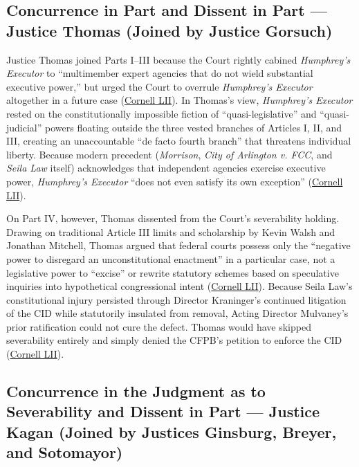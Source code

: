 \documentclass[12pt]{article}
\begin{document}
\subsection{Concurrence in Part and Dissent in Part --- Justice Thomas (Joined by Justice Gorsuch)}

Justice Thomas joined Parts I--III because the Court rightly cabined \textit{Humphrey's Executor} to ``multimember expert agencies that do not wield substantial executive power,'' but urged the Court to overrule \textit{Humphrey's Executor} altogether in a future case (\href{https://www.law.cornell.edu/supremecourt/text/19-7}{Cornell LII}). In Thomas's view, \textit{Humphrey's Executor} rested on the constitutionally impossible fiction of ``quasi-legislative'' and ``quasi-judicial'' powers floating outside the three vested branches of Articles I, II, and III, creating an unaccountable ``de facto fourth branch'' that threatens individual liberty. Because modern precedent (\textit{Morrison}, \textit{City of Arlington v. FCC}, and \textit{Seila Law} itself) acknowledges that independent agencies exercise executive power, \textit{Humphrey's Executor} ``does not even satisfy its own exception'' (\href{https://www.law.cornell.edu/supremecourt/text/19-7}{Cornell LII}).

On Part IV, however, Thomas dissented from the Court's severability holding. Drawing on traditional Article III limits and scholarship by Kevin Walsh and Jonathan Mitchell, Thomas argued that federal courts possess only the ``negative power to disregard an unconstitutional enactment'' in a particular case, not a legislative power to ``excise'' or rewrite statutory schemes based on speculative inquiries into hypothetical congressional intent (\href{https://www.law.cornell.edu/supremecourt/text/19-7}{Cornell LII}). Because Seila Law's constitutional injury persisted through Director Kraninger's continued litigation of the CID while statutorily insulated from removal, Acting Director Mulvaney's prior ratification could not cure the defect. Thomas would have skipped severability entirely and simply denied the CFPB's petition to enforce the CID (\href{https://www.law.cornell.edu/supremecourt/text/19-7}{Cornell LII}).

\subsection{Concurrence in the Judgment as to Severability and Dissent in Part --- Justice Kagan (Joined by Justices Ginsburg, Breyer, and Sotomayor)}
\end{document}
